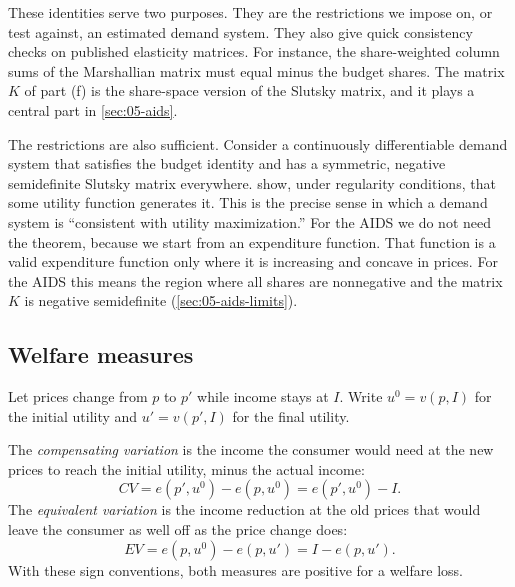 These identities serve two purposes. They are the restrictions we impose on, or test against, an estimated
demand system. They also give quick consistency checks on published elasticity matrices. For instance, the
share-weighted column sums of the Marshallian matrix must equal minus the budget shares. The matrix $K$ of
part (f) is the share-space version of the Slutsky matrix, and it plays a central part in \cref{sec:05-aids}.

\begin{remark}[Integrability]\label{rem:05-integrability}
The restrictions are also sufficient. Consider a continuously differentiable demand
system that satisfies the budget identity and has a symmetric, negative semidefinite Slutsky matrix
everywhere. \citet{HurwiczUzawa1971} show, under regularity conditions, that some utility function generates
it. This is the
precise sense in which a demand system is ``consistent with utility maximization.'' For the AIDS we do not
need the theorem, because we start from an expenditure function. That function is a valid expenditure
function only where it is increasing and concave in prices. For the AIDS this means the region where all
shares are nonnegative and the matrix $K$ is negative semidefinite (\cref{sec:05-aids-limits}).
\end{remark}

\subsection{Welfare measures}\label{sec:05-cv-ev}

Let prices change from $p$ to $p'$ while income stays at $I$. Write $u^0 = v(p, I)$ for the initial utility
and $u' = v(p', I)$ for the final utility.

\begin{definition}\label{def:05-cv-ev}
The \emph{compensating variation} is the income the consumer would need at the new prices to reach the
initial utility, minus the actual income:
\begin{equation}\label{eq:05-cv}
CV = e(p', u^0) - e(p, u^0) = e(p', u^0) - I .
\end{equation}
The \emph{equivalent variation} is the income reduction at the old prices that would leave the consumer as
well off as the price change does:
\begin{equation}\label{eq:05-ev}
EV = e(p, u^0) - e(p, u') = I - e(p, u') .
\end{equation}
With these sign conventions, both measures are positive for a welfare loss.
\end{definition}

